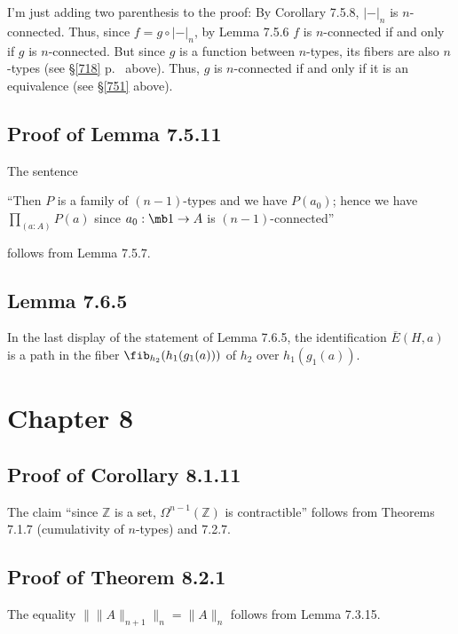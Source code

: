 \documentclass[12pt]{article}
\begin{document}
I'm just adding two parenthesis to the proof: By Corollary 7.5.8, $|-|_n$ is $n$-connected. Thus, since $f=g\circ |-|_n$, by Lemma 7.5.6 $f$ is $n$-connected if and only if $g$ is $n$-connected. But since $g$ is a function between $n$-types, its fibers are also $n$-types (see \S\ref{718} p.~\pageref{718} above). Thus, $g$ is $n$-connected if and only if it is an equivalence (see \S\ref{751} above).


\subsection{Proof of Lemma 7.5.11}

The sentence 

\nn``Then $P$ is a family of $(n-1)$-types and we have $P(a_0)$; hence we have $\prod_{(a:A)}P(a)$ since $a_0:\mb1\to A$ is $(n-1)$-connected''

\nn follows from Lemma 7.5.7.


\subsection{Lemma 7.6.5}

In the last display of the statement of Lemma 7.6.5, the identification $\overline{E}(H,a)$ is a path in the fiber $\fib_{h_2}(h_1(g_1(a)))$ of $h_2$ over $h_1(g_1(a))$.


\section{Chapter 8}

\subsection{Proof of Corollary 8.1.11}

The claim ``since $\mathbb Z$ is a set, $\Omega^{n-1}(\mathbb Z)$ is contractible'' follows from Theorems 7.1.7 (cumulativity of $n$-types) and 7.2.7.


\subsection{Proof of Theorem 8.2.1}

The equality $\lVert\lVert A\rVert_{n+1}\rVert_n=\lVert A\rVert_n$ follows from Lemma 7.3.15.
\end{document}
